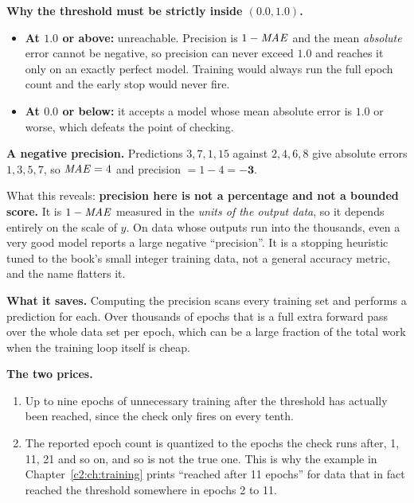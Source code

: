 \textbf{Why the threshold must be strictly inside $(0.0, 1.0)$.}
\begin{itemize}
  \item \textbf{At $1.0$ or above:} unreachable. Precision is $1 - \mathit{MAE}$ and the mean
    \emph{absolute} error cannot be negative, so precision can never exceed $1.0$ and reaches it
    only on an exactly perfect model. Training would always run the full epoch count and the early
    stop would never fire.
  \item \textbf{At $0.0$ or below:} it accepts a model whose mean absolute error is $1.0$ or worse,
    which defeats the point of checking.
\end{itemize}

\textbf{A negative precision.} Predictions $3, 7, 1, 15$ against $2, 4, 6, 8$ give absolute errors
$1, 3, 5, 7$, so $\mathit{MAE} = 4$ and precision $= 1 - 4 = \mathbf{-3}$.

What this reveals: \textbf{precision here is not a percentage and not a bounded score.} It is
$1 - \mathit{MAE}$ measured in the \emph{units of the output data}, so it depends entirely on the scale of
$y$. On data whose outputs run into the thousands, even a very good model reports a large negative
``precision''. It is a stopping heuristic tuned to the book's small integer training data, not a
general accuracy metric, and the name flatters it. 

\textbf{What it saves.} Computing the precision scans every training set and performs a prediction
for each. Over thousands of epochs that is a full extra forward pass over the whole data set per
epoch, which can be a large fraction of the total work when the training loop itself is cheap.

\textbf{The two prices.}
\begin{enumerate}
  \item Up to nine epochs of unnecessary training after the threshold has actually been reached,
    since the check only fires on every tenth.
  \item The reported epoch count is quantized to the epochs the check runs after, 1, 11, 21 and so
    on, and so is not the true one. This is why the example in Chapter~\ref{c2:ch:training} prints
    ``reached after 11 epochs'' for data that in fact reached the threshold somewhere in epochs 2
    to 11.
\end{enumerate}


